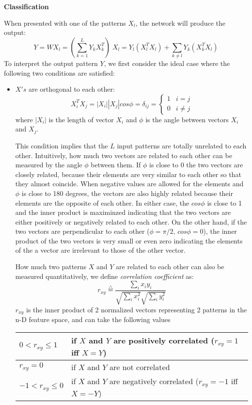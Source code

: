 {\bf Classification}

When presented with one of the patterns $X_l$, the network will produce the 
output:
\[
Y=WX_l=(\sum_{k=1}^L Y_k X_k^T)\;X_l=Y_l(X_l^TX_l)+\sum_{k\neq l}Y_k(X_k^TX_l)
\]
To interpret the output pattern $Y$, we first consider the ideal case where the
following two conditions are satisfied:
\begin{itemize}
\item $X's$ are orthogonal to each other:
\[	X_i^TX_j=|X_i| |X_j| cos \phi 
	= \delta_{ij}=\left\{ \begin{array}{ll} 1 & i=j \\ 0 & i\ne j \end{array} 
	\right. \]
	where $|X_i|$ is the length of vector $X_i$ and $\phi$ is the angle between
	vectors $X_i$ and $X_j$.

This condition implies that the $L$ input patterns are totally unrelated 
to each	other. Intuitively, how much two vectors are related to each other
can be measured by the angle $\phi$ between them. If $\phi$ is close to 0
the two vectors are closely related, because their elements are very similar
to each other so that they almost coincide. When negative values are allowed 
for the elements and $\phi$ is close to 180 degrees, the vectors are also 
highly related because their elements are the opposite of each other. In 
either case, the $cos \phi$ is close to 1 and the inner product is maximinzed
indicating that the two vectors are either positively or negatively related 
to each other. On the other hand, if the two vectors are perpendicular to each
other ($\phi=\pi/2$, $cos \phi = 0$), the inner product of the two vectors is
very small or even zero indicating the elements of the a vector are irrelevant
to those of the other vector.

How much two patterns $X$ and $Y$ are related to each other can also be measured
quantitatively, we define {\em correlation coefficient} as:
	\[ r_{xy}\stackrel{\triangle}{=}\frac{\sum_i x_i y_i}
	{\sqrt{\sum_i x_i^2}\sqrt{\sum_i y_i^2} }	\]
$r_{xy}$ is the inner product of 2 normalized vectors representing 2 patterns
in the n-D feature space, and can take the following values

\begin{tabular}{l|l}	\hline
$ 0 < r_{xy} \leq 1$ &  if $X$ and $Y$ are positively correlated ($r_{xy}=1$ iff $X=Y$)	
\\ \hline
$ r_{xy} =0 $ 	     &  if $X$ and $Y$ are not correlated\\ \hline
$ -1<r_{xy} \leq 0 $ &  if $X$ and $Y$ are negatively correlated ($r_{xy}=-1$ iff $X=-Y$) 
\\ \hline
\end{tabular} 


\end{itemize}
